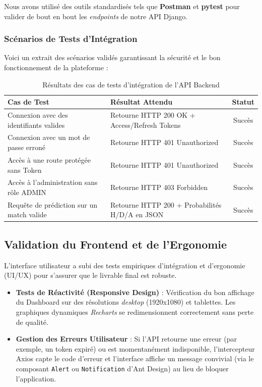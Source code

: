 Nous avons utilisé des outils standardisés tels que \textbf{Postman} et \textbf{pytest} pour valider de bout en bout les \textit{endpoints} de notre API Django.

\subsubsection{Scénarios de Tests d'Intégration}
Voici un extrait des scénarios validés garantissant la sécurité et le bon fonctionnement de la plateforme :

\begin{table}[H]
    \centering
    \renewcommand{\arraystretch}{1.5}
    \begin{tabularx}{\textwidth}{|L|Y|c|}
        \hline
        \textbf{Cas de Test} & \textbf{Résultat Attendu} & \textbf{Statut} \\
        \hline
        Connexion avec des identifiants valides & Retourne HTTP 200 OK + Access/Refresh Tokens & \textcolor{EMSIGreen}{Succès} \\
        \hline
        Connexion avec un mot de passe erroné & Retourne HTTP 401 Unauthorized & \textcolor{EMSIGreen}{Succès} \\
        \hline
        Accès à une route protégée sans Token & Retourne HTTP 401 Unauthorized & \textcolor{EMSIGreen}{Succès} \\
        \hline
        Accès à l'administration sans rôle ADMIN & Retourne HTTP 403 Forbidden & \textcolor{EMSIGreen}{Succès} \\
        \hline
        Requête de prédiction sur un match valide & Retourne HTTP 200 + Probabilités H/D/A en JSON & \textcolor{EMSIGreen}{Succès} \\
        \hline
    \end{tabularx}
    \caption{Résultats des cas de tests d'intégration de l'API Backend}
\end{table}

\subsection{Validation du Frontend et de l'Ergonomie}
L'interface utilisateur a subi des tests empiriques d'intégration et d'ergonomie (UI/UX) pour s'assurer que le livrable final est robuste.
\begin{itemize}
    \item \textbf{Tests de Réactivité (Responsive Design)} : Vérification du bon affichage du Dashboard sur des résolutions \textit{desktop} (1920x1080) et tablettes. Les graphiques dynamiques \textit{Recharts} se redimensionnent correctement sans perte de qualité.
    \item \textbf{Gestion des Erreurs Utilisateur} : Si l'API retourne une erreur (par exemple, un token expiré) ou est momentanément indisponible, l'intercepteur Axios capte le code d'erreur et l'interface affiche un message convivial (via le composant \texttt{Alert} ou \texttt{Notification} d'Ant Design) au lieu de bloquer l'application.
\end{itemize}

